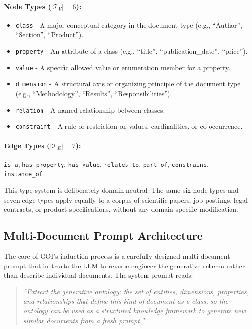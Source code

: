 \documentclass[runningheads,a4paper]{llncs}
\begin{document}
\paragraph{Node Types ($|\mathcal{T}_V| = 6$):}
\begin{itemize}
  \item \texttt{class} - A major conceptual category in the document
    type (e.g., ``Author'', ``Section'', ``Product'').
  \item \texttt{property} - An attribute of a class (e.g., ``title'',
    ``publication\_date'', ``price'').
  \item \texttt{value} - A specific allowed value or enumeration
    member for a property.
  \item \texttt{dimension} - A structural axis or organizing principle
    of the document type (e.g., ``Methodology'', ``Results'',
    ``Responsibilities'').
  \item \texttt{relation} - A named relationship between classes.
  \item \texttt{constraint} - A rule or restriction on values,
    cardinalities, or co-occurrence.
\end{itemize}

{\sloppy\paragraph{Edge Types ($|\mathcal{T}_E| = 7$):}
\texttt{is\_a}, \texttt{has\_property}, \texttt{has\_value},
\texttt{relates\_to}, \texttt{part\_of}, \texttt{constrains},
\texttt{instance\_of}.\par}

This type system is deliberately domain-neutral. The same six node types
and seven edge types apply equally to a corpus of scientific papers, job
postings, legal contracts, or product specifications, without any
domain-specific modification.

\subsection{Multi-Document Prompt Architecture}

The core of GOI's induction process is a carefully designed
multi-document prompt that instructs the LLM to reverse-engineer the
generative schema rather than describe individual documents. The system
prompt reads:

\begin{quote}
\textit{``Extract the generative ontology: the set of entities,
dimensions, properties, and relationships that define this kind of
document as a class, so the ontology can be used as a structured
knowledge framework to generate new similar documents from a fresh
prompt.''}
\end{quote}
\end{document}
